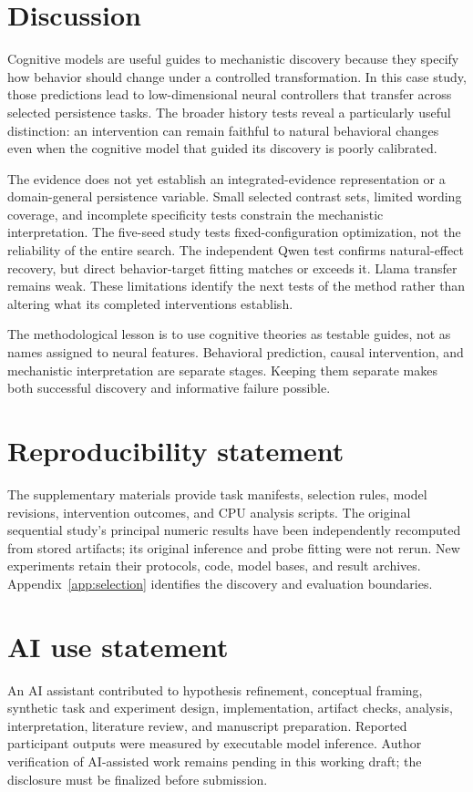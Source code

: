 \documentclass{article}
\begin{document}
\section{Discussion}
Cognitive models are useful guides to mechanistic discovery because they specify how behavior should change under a controlled transformation. In this case study, those predictions lead to low-dimensional neural controllers that transfer across selected persistence tasks. The broader history tests reveal a particularly useful distinction: an intervention can remain faithful to natural behavioral changes even when the cognitive model that guided its discovery is poorly calibrated.

The evidence does not yet establish an integrated-evidence representation or a domain-general persistence variable. Small selected contrast sets, limited wording coverage, and incomplete specificity tests constrain the mechanistic interpretation. The five-seed study tests fixed-configuration optimization, not the reliability of the entire search. The independent Qwen test confirms natural-effect recovery, but direct behavior-target fitting matches or exceeds it. Llama transfer remains weak. These limitations identify the next tests of the method rather than altering what its completed interventions establish.

The methodological lesson is to use cognitive theories as testable guides, not as names assigned to neural features. Behavioral prediction, causal intervention, and mechanistic interpretation are separate stages. Keeping them separate makes both successful discovery and informative failure possible.

\section*{Reproducibility statement}
The supplementary materials provide task manifests, selection rules, model revisions, intervention outcomes, and CPU analysis scripts. The original sequential study's principal numeric results have been independently recomputed from stored artifacts; its original inference and probe fitting were not rerun. New experiments retain their protocols, code, model bases, and result archives. Appendix~\ref{app:selection} identifies the discovery and evaluation boundaries.

\section*{AI use statement}
An AI assistant contributed to hypothesis refinement, conceptual framing, synthetic task and experiment design, implementation, artifact checks, analysis, interpretation, literature review, and manuscript preparation. Reported participant outputs were measured by executable model inference. Author verification of AI-assisted work remains pending in this working draft; the disclosure must be finalized before submission.
\end{document}
